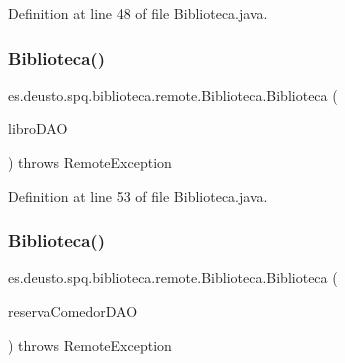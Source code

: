 Definition at line 48 of file Biblioteca.\+java.

\mbox{\label{classes_1_1deusto_1_1spq_1_1biblioteca_1_1remote_1_1_biblioteca_ab4338bb1554332800dfbbcf7902dbf44}} 
\subsubsection{\texorpdfstring{Biblioteca()}{Biblioteca()}\hspace{0.1cm}{\footnotesize\ttfamily [2/6]}}
{\footnotesize\ttfamily es.\+deusto.\+spq.\+biblioteca.\+remote.\+Biblioteca.\+Biblioteca (\begin{DoxyParamCaption}\item[{\mbox{\hyperlink{interfacees_1_1deusto_1_1spq_1_1biblioteca_1_1dao_1_1_i_libro_d_a_o}{I\+Libro\+D\+AO}}}]{libro\+D\+AO }\end{DoxyParamCaption}) throws Remote\+Exception}



Definition at line 53 of file Biblioteca.\+java.

\mbox{\label{classes_1_1deusto_1_1spq_1_1biblioteca_1_1remote_1_1_biblioteca_a29f192a64569bf082dde82af27edf39c}} 
\subsubsection{\texorpdfstring{Biblioteca()}{Biblioteca()}\hspace{0.1cm}{\footnotesize\ttfamily [3/6]}}
{\footnotesize\ttfamily es.\+deusto.\+spq.\+biblioteca.\+remote.\+Biblioteca.\+Biblioteca (\begin{DoxyParamCaption}\item[{\mbox{\hyperlink{interfacees_1_1deusto_1_1spq_1_1biblioteca_1_1dao_1_1_i_reserva_comedor_d_a_o}{I\+Reserva\+Comedor\+D\+AO}}}]{reserva\+Comedor\+D\+AO }\end{DoxyParamCaption}) throws Remote\+Exception}



